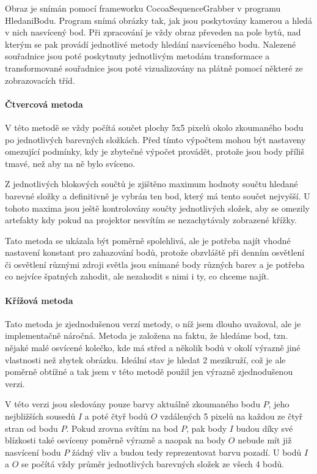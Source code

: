 \documentclass[twoside,12pt]{article}
\newcommand{\podpodsekce}[1]{\paragraph{#1}\quad\vskip 6pt}
\begin{document}
Obraz je snímán pomocí frameworku CocoaSequenceGrabber v programu HledaniBodu. Program snímá obrázky tak, jak jsou poskytovány kamerou a hledá v nich nasvícený bod. Při zpracování je vždy obraz převeden na pole bytů, nad kterým se pak provádí jednotlivé metody hledání nasvíceného bodu. Nalezené souřadnice jsou poté poskytnuty jednotlivým metodám transformace a transformované souřadnice jsou poté vizualizovány na plátně pomocí některé ze zobrazovacích tříd.

\podpodsekce{Čtvercová metoda}

V této metodě se vždy počítá součet plochy 5x5 pixelů okolo zkoumaného bodu po jednotlivých barevných složkách. Před tímto výpočtem mohou být nastaveny omezující podmínky, kdy je zbytečné výpočet provádět, protože jsou body příliš tmavé, než aby na ně bylo svíceno. 

Z jednotlivých blokových součtů je zjištěno maximum hodnoty součtu hledané barevné složky a definitivně je vybrán ten bod, který má tento součet nejvyšší. U tohoto maxima jsou ještě kontrolovány součty jednotlivých složek, aby se omezily artefakty kdy pokud na projektor nesvítím se nezachytávaly zobrazené křížky.

Tato metoda se ukázala být poměrně spolehlivá, ale je potřeba najít vhodné nastavení konstant pro zahazování bodů, protože obzvláště při denním osvětlení či osvětlení různými zdroji světla  jsou snímané body různých barev a je potřeba co nejvíce špatných zahodit, ale nezahodit s nimi i ty, co chceme najít.

\podpodsekce{Křížová metoda}
Tato metoda je zjednodušenou verzí metody, o níž jsem dlouho uvažoval, ale je implementačně náročná. Metoda je založena na faktu, že hledáme bod, tzn. nějaké malé osvícené kolečko, kde má střed a několik bodů v okolí výrazně jiné vlastnosti než zbytek obrázku. Ideální stav je hledat 2 mezikruží, což je ale poměrně obtížné a tak jsem v této metodě použil jen výrazně zjednodušenou verzi.

V této verzi jsou sledovány pouze barvy aktuálně zkoumaného bodu $P$, jeho nejbližších sousedů $I$ a poté čtyř bodů $O$ vzdálených 5 pixelů na každou ze čtyř stran od bodu $P$. Pokud zrovna svítím na bod $P$, pak body $I$ budou díky své blízkosti také osvíceny poměrně výrazně a naopak na body $O$ nebude mít již nasvícení bodu $P$ žádný vliv a budou tedy reprezentovat barvu pozadí. U bodů $I$ a $O$ se počítá vždy průměr jednotlivých barevných složek ze všech 4 bodů. 
\end{document}
